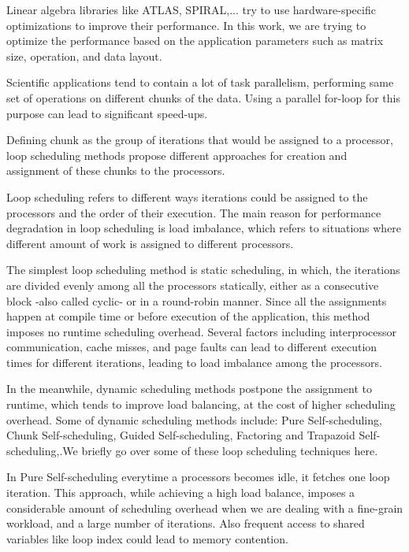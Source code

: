Linear algebra libraries like ATLAS, SPIRAL,... try to use hardware-specific
optimizations to improve their performance. In this work, we are trying to
optimize the performance based on the application parameters such as matrix
size, operation, and data layout.   

Scientific applications tend to contain a lot of task parallelism, performing
same set of operations on different chunks of the data. Using a parallel
for-loop for this purpose can lead to significant speed-ups.

Defining chunk as the group of iterations that would be assigned to a processor,
loop scheduling methods propose different approaches for creation and assignment
of these chunks to the processors.


Loop scheduling refers to different ways iterations could be assigned to the
processors and the order of their execution. The main reason for performance
degradation in loop scheduling is load imbalance, which refers to situations
where different amount of work is assigned to different
processors\cite{ciorba2018openmp}.    

The simplest loop scheduling method is static scheduling, in which, the
iterations are divided evenly among all the processors statically, either as a
consecutive block -also called cyclic- or in a round-robin
manner\cite{liu1994safe}. Since all the assignments happen at compile time or
before execution of the application, this method imposes no runtime scheduling
overhead. Several factors including interprocessor communication, cache misses,
and page faults can lead to different execution times for different iterations,
leading to load imbalance among the processors\cite{philip1995increasing}.

In the meanwhile, dynamic scheduling methods postpone the assignment to runtime,
which tends to improve load balancing, at the cost of higher scheduling
overhead. Some of dynamic scheduling methods include: Pure Self-scheduling,
Chunk Self-scheduling, Guided Self-scheduling\cite{polychronopoulos1987guided},
Factoring\cite{hummel1992factoring} and Trapazoid
Self-scheduling\cite{tzen1993trapezoid},\cite{liu1994safe}.We briefly go over
some of these loop scheduling techniques here.


In Pure Self-scheduling everytime a processors becomes idle, it fetches one loop
iteration. This approach, while achieving a high load balance, imposes a
considerable amount of scheduling overhead when we are dealing with a fine-grain
workload, and a large number of iterations. Also frequent access to shared
variables like loop index could lead to memory contention\cite{liu1994safe}. 

